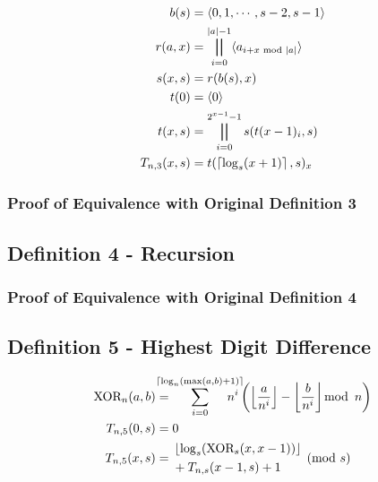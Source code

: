 \documentclass[conference]{IEEEtran}
\begin{document}
\begin{equation}
    \label{eq:pnd03}
    \begin{aligned}
      b(s) &= \tuple{0, 1, \cdots, s - 2, s - 1} \\
   r(a, x) &= \bigparallel_{i=0}^{|a| - 1} \tuple{a_{i + x \text{ mod }|a|}} \\
   s(x, s) &= r(b(s), x) \\
      t(0) &= \tuple{0} \\
      t(x, s) &= \bigparallel_{i=0}^{2^{x-1}-1} s(t(x-1)_i, s)  \\
T_{n,3}(x, s) &= t(\ceil{\log_s(x + 1)}, s)_x
    \end{aligned}
\end{equation}

\subsubsection{Proof of Equivalence with Original Definition 3}

\subsection{Definition 4 - Recursion}


\subsubsection{Proof of Equivalence with Original Definition 4}

\subsection{Definition 5 - Highest Digit Difference}

\begin{equation}
    \begin{aligned}
\text{XOR}_{n}(a, b) &= \hspace{-13pt} \sum_{i=0}^{\ceil{\log_{n}(\max(a,b) + 1)}} \hspace{-15pt} n^i \left(\floor{\dfrac{a}{n^i}} - \floor{\dfrac{b}{n^i}} \mod{n}\right) \\
       T_{n,5}(0, s) &= 0 \\
       T_{n,5}(x, s) &= \begin{aligned}[c]
           &\floor{\log_s(\text{XOR}_{s}(x, x - 1))} \\
           &+ T_{n,s}(x - 1, s) + 1
       \end{aligned} \pmod{s}
    \end{aligned}
\end{equation}
\end{document}

